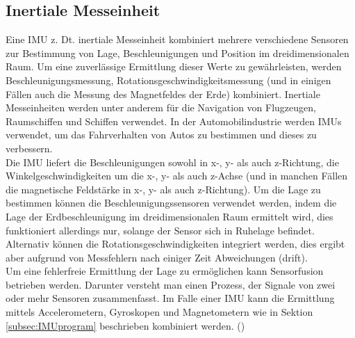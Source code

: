 \subsection{Inertiale Messeinheit}
\label{subsec:tIMU}
Eine \ac{IMU} z. Dt. inertiale Messeinheit kombiniert mehrere verschiedene Sensoren zur Bestimmung von Lage, Beschleunigungen und Position im dreidimensionalen Raum. Um eine zuverlässige Ermittlung dieser Werte zu gewährleisten, werden Beschleunigungsmessung, Rotationsgeschwindigkeitsmessung (und in einigen Fällen auch die Messung des Magnetfeldes der Erde) kombiniert. Inertiale Messeinheiten werden unter anderem für die Navigation von Flugzeugen, Raumschiffen und Schiffen verwendet. In der Automobilindustrie werden \ac{IMU}s verwendet, um das Fahrverhalten von Autos zu bestimmen und dieses zu verbessern.\\
Die \ac{IMU} liefert die Beschleunigungen sowohl in x-, y- als auch z-Richtung, die Winkelgeschwindigkeiten um die x-, y- als auch z-Achse (und in manchen Fällen die magnetische Feldstärke in x-, y- als auch z-Richtung). Um die Lage zu bestimmen können die Beschleunigungssensoren verwendet werden, indem die Lage der Erdbeschleunigung im dreidimensionalen Raum ermittelt wird, dies funktioniert allerdings nur, solange der Sensor sich in Ruhelage befindet. Alternativ können die Rotationsgeschwindigkeiten integriert werden, dies ergibt aber aufgrund von Messfehlern nach einiger Zeit Abweichungen (drift).\\ Um eine fehlerfreie Ermittlung der Lage zu ermöglichen kann Sensorfusion betrieben werden. Darunter versteht man einen Prozess, der Signale von zwei oder mehr Sensoren zusammenfasst. Im Falle einer \ac{IMU} kann die Ermittlung mittels Accelerometern, Gyroskopen und Magnetometern wie in Sektion \ref{subsec:IMUprogram} beschrieben kombiniert werden.
(\cite{UCAM-CL-TR-696})
